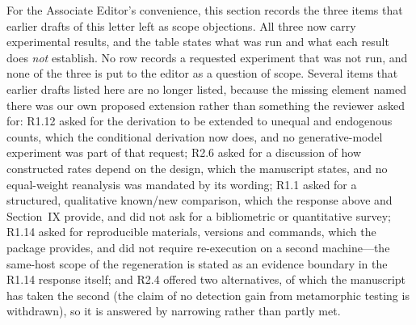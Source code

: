 \documentclass[10pt,letterpaper]{article}
\begin{document}
For the Associate Editor's convenience, this section records the three items
that earlier drafts of this letter left as scope objections. All three now carry
experimental results, and the table states what was run and what each result does
\emph{not} establish. No row records a requested experiment that was not run, and
none of the three is put to the editor as a question of scope. Several items that
earlier drafts listed here are no longer listed,
because the missing element named there was our own proposed extension rather
than something the reviewer asked for: R1.12 asked for the derivation to be
extended to unequal and endogenous counts, which the conditional derivation
now does, and no generative-model experiment was part of that request; R2.6
asked for a discussion of how constructed rates depend on the design, which the
manuscript states, and no equal-weight reanalysis was mandated by its wording;
R1.1 asked for a structured, qualitative known/new comparison, which the
response above and Section~IX provide, and did not ask for a bibliometric or
quantitative survey; R1.14 asked for reproducible materials, versions and
commands, which the package provides, and did not require re-execution on a
second machine---the same-host scope of the regeneration is stated as an
evidence boundary in the R1.14 response itself; and R2.4 offered two
alternatives, of which the manuscript has taken the second (the claim of no
detection gain from metamorphic testing is withdrawn), so it is answered by
narrowing rather than partly met.
\end{document}

